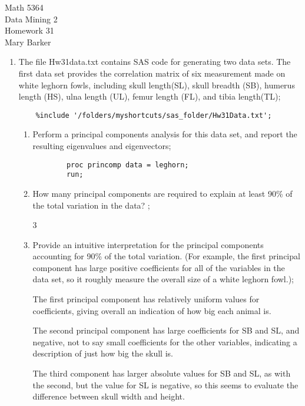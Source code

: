 \documentclass[11pt]{article}
\begin{document}
\noindent\large{Math 5364}\\
\large{Data Mining 2}\\
\large{Homework 31}\\
\large{Mary Barker}

\begin{enumerate}
\item The file Hw31data.txt contains SAS code for generating two data sets. 
	The first data set provides the correlation matrix of six measurement 
	made on white leghorn fowls, including skull length(SL), skull 
	breadth (SB), humerus length (HS), ulna length (UL), femur length 
	(FL), and tibia length(TL);

\begin{Verbatim}
	%include '/folders/myshortcuts/sas_folder/Hw31Data.txt';
\end{Verbatim}

	\begin{enumerate}
	\item 
	Perform a principal components analysis for this data set, and 
		report the resulting eigenvalues and eigenvectors;

\begin{Verbatim}
		proc princomp data = leghorn;
		run;
\end{Verbatim}
		

	\item 
	How many principal components are required to explain at least 
		90\% of the total variation in the data? ;

		3

	\item 
	Provide an intuitive interpretation for the principal components 
		accounting for 90\% of the total variation. (For example, the 
		first principal component has large positive coefficients for 
		all of the variables in the data set, so it roughly measure 
		the overall size of a white leghorn fowl.);

			The first principal component has relatively uniform values 
			for coefficients, giving overall an indication of how big each animal is. 

			The second principal component has large coefficients for 
			SB and SL, and negative, not to say small coefficients 
			for the other variables, indicating a description of 
			just how big the skull is.

			The third component has larger absolute values for SB and SL, 
			as with the second, but the value for SL is negative, so 
			this seems to evaluate the difference between skull width 
			and height.
	\end{enumerate}


\end{enumerate}
\end{document}
